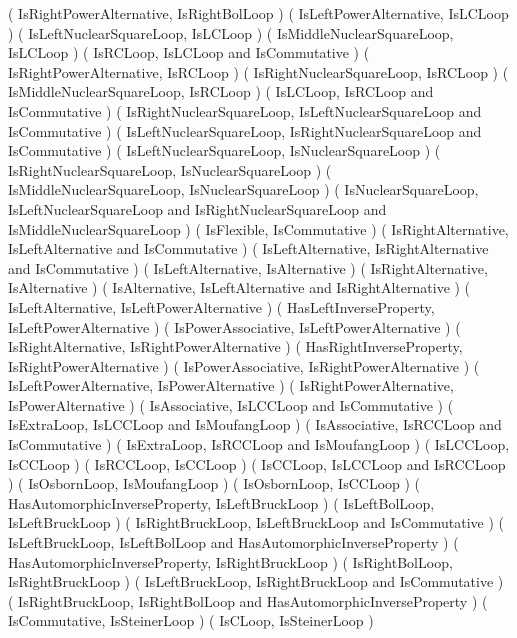 ( IsRightPowerAlternative, IsRightBolLoop )
( IsLeftPowerAlternative, IsLCLoop )
( IsLeftNuclearSquareLoop, IsLCLoop )
( IsMiddleNuclearSquareLoop, IsLCLoop )
( IsRCLoop, IsLCLoop and IsCommutative )
( IsRightPowerAlternative, IsRCLoop )
( IsRightNuclearSquareLoop, IsRCLoop )
( IsMiddleNuclearSquareLoop, IsRCLoop )
( IsLCLoop, IsRCLoop and IsCommutative )
( IsRightNuclearSquareLoop, IsLeftNuclearSquareLoop and IsCommutative )
( IsLeftNuclearSquareLoop, IsRightNuclearSquareLoop and IsCommutative )
( IsLeftNuclearSquareLoop, IsNuclearSquareLoop )
( IsRightNuclearSquareLoop, IsNuclearSquareLoop )
( IsMiddleNuclearSquareLoop, IsNuclearSquareLoop )
( IsNuclearSquareLoop, IsLeftNuclearSquareLoop
    and IsRightNuclearSquareLoop and IsMiddleNuclearSquareLoop )
( IsFlexible, IsCommutative )
( IsRightAlternative, IsLeftAlternative and IsCommutative )
( IsLeftAlternative, IsRightAlternative and IsCommutative )
( IsLeftAlternative, IsAlternative )
( IsRightAlternative, IsAlternative )
( IsAlternative, IsLeftAlternative and IsRightAlternative )
( IsLeftAlternative, IsLeftPowerAlternative )
( HasLeftInverseProperty, IsLeftPowerAlternative )
( IsPowerAssociative, IsLeftPowerAlternative )
( IsRightAlternative, IsRightPowerAlternative )
( HasRightInverseProperty, IsRightPowerAlternative )
( IsPowerAssociative, IsRightPowerAlternative )
( IsLeftPowerAlternative, IsPowerAlternative )
( IsRightPowerAlternative, IsPowerAlternative )
( IsAssociative, IsLCCLoop and IsCommutative )
( IsExtraLoop, IsLCCLoop and IsMoufangLoop )
( IsAssociative, IsRCCLoop and IsCommutative )
( IsExtraLoop, IsRCCLoop and IsMoufangLoop )
( IsLCCLoop, IsCCLoop )
( IsRCCLoop, IsCCLoop )
( IsCCLoop, IsLCCLoop and IsRCCLoop )
( IsOsbornLoop, IsMoufangLoop )
( IsOsbornLoop, IsCCLoop )
( HasAutomorphicInverseProperty, IsLeftBruckLoop )
( IsLeftBolLoop, IsLeftBruckLoop )
( IsRightBruckLoop, IsLeftBruckLoop and IsCommutative )
( IsLeftBruckLoop, IsLeftBolLoop and HasAutomorphicInverseProperty )
( HasAutomorphicInverseProperty, IsRightBruckLoop )
( IsRightBolLoop, IsRightBruckLoop )
( IsLeftBruckLoop, IsRightBruckLoop and IsCommutative )
( IsRightBruckLoop, IsRightBolLoop and HasAutomorphicInverseProperty )
( IsCommutative, IsSteinerLoop )
( IsCLoop, IsSteinerLoop )



\endtt
